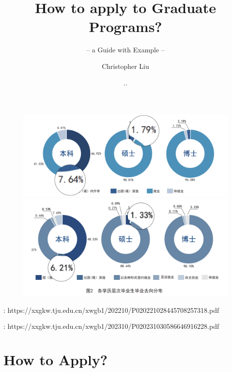 \documentclass[UTF8]{beamer}
\author{Christopher Liu}
\title{How to apply to Graduate Programs?}
\subtitle{-- a Guide with Example --}
\institute{College of Intelligence and Computing}
\date{\tiny \the\year.\the\month.\the\day}
\begin{document}
\begin{frame}
  \titlepage
\end{frame}


\begin{frame}
\begin{figure}
  \centering
  \tiny
  \includegraphics[width=.7\linewidth]{pic/2021-SA.png}
  \includegraphics[width=.7\linewidth]{pic/2022-SA.png}
\end{figure}
{\tiny {}: https://xxgkw.tju.edu.cn/xwgb1/202210/P020221028445708257318.pdf}

{\tiny {}: https://xxgkw.tju.edu.cn/xwgb1/202310/P020231030586646916228.pdf}
\end{frame}


\begin{frame}
  \tableofcontents[sectionstyle=show,subsectionstyle=show/shaded/hide,subsubsectionstyle=show/shaded/hide]
\end{frame}



\section{How to Apply?}
\end{document}
